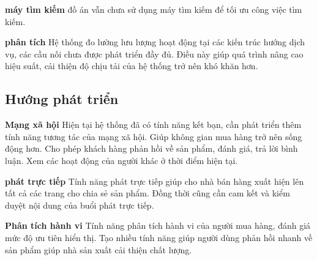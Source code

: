 	\textbf{máy tìm kiếm} đồ án vẫn chưa sử dụng máy tìm kiếm để tối ưu công việc tìm kiếm.
	
	\textbf{phân tích} Hệ thống đo lường lưu lượng hoạt động tại các kiến trúc hướng dịch vụ, các cầu nối chưa được phát triển đầy đủ. Điều này giúp quá trình nâng cao hiệu suất, cải thiện độ chịu tải của hệ thống trở nên khó khăn hơn.
	
	\subsection*{Hướng phát triển}
	
	\textbf{Mạng xã hội} Hiện tại hệ thống đã có tính năng kết bạn, cần phát triển thêm tính năng tương tác của mạng xã hội. Giúp không gian mua hàng trở nên sống động hơn. Cho phép khách hàng phản hồi về sản phẩm, đánh giá, trả lời bình luận. Xem các hoạt động của người khác ở thời điểm hiện tại.
	
	\textbf{phát trực tiếp} Tính năng phát trực tiếp giúp cho nhà bán hàng xuất hiện lên tất cả các trang cho chia sẻ sản phẩm. Đồng thời cũng cần cam kết và kiểm duyệt nội dung của buổi phát trực tiếp.
	
	\textbf{Phân tích hành vi} Tính năng phân tích hành vi của người mua hàng, đánh giá mức độ ưu tiên hiển thị. Tạo nhiều tính năng giúp người dùng phản hồi nhanh về sản phẩm giúp nhà sản xuất cải thiện chất lượng.
	